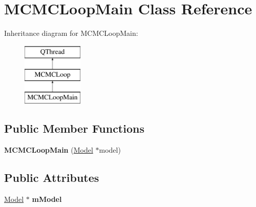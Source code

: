 \hypertarget{class_m_c_m_c_loop_main}{\section{M\-C\-M\-C\-Loop\-Main Class Reference}
\label{class_m_c_m_c_loop_main}
}
Inheritance diagram for M\-C\-M\-C\-Loop\-Main\-:\begin{figure}[H]
\begin{center}
\leavevmode
\includegraphics[height=3.000000cm]{class_m_c_m_c_loop_main}
\end{center}
\end{figure}
\subsection*{Public Member Functions}
\begin{DoxyCompactItemize}
\item 
\hypertarget{class_m_c_m_c_loop_main_aa3bd2f67988133eb87b11c06046be783}{{\bfseries M\-C\-M\-C\-Loop\-Main} (\hyperlink{class_model}{Model} $\ast$model)}\label{class_m_c_m_c_loop_main_aa3bd2f67988133eb87b11c06046be783}

\end{DoxyCompactItemize}
\subsection*{Public Attributes}
\begin{DoxyCompactItemize}
\item 
\hypertarget{class_m_c_m_c_loop_main_a70e93b41b192e74438fd33215397734b}{\hyperlink{class_model}{Model} $\ast$ {\bfseries m\-Model}}\label{class_m_c_m_c_loop_main_a70e93b41b192e74438fd33215397734b}

\end{DoxyCompactItemize}
